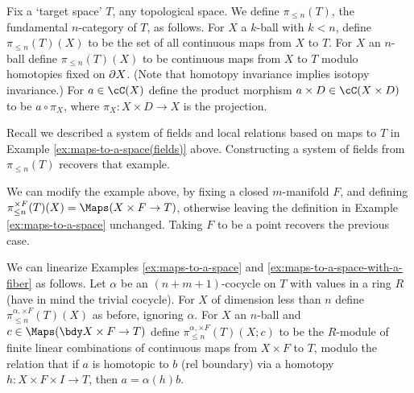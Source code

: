 \begin{example}
\rm
\label{ex:maps-to-a-space}%
Fix a `target space' $T$, any topological space.
We define $\pi_{\leq n}(T)$, the fundamental $n$-category of $T$, as follows.
For $X$ a $k$-ball with $k < n$, define $\pi_{\leq n}(T)(X)$ to be the set of 
all continuous maps from $X$ to $T$.
For $X$ an $n$-ball define $\pi_{\leq n}(T)(X)$ to be continuous maps from $X$ to $T$ modulo
homotopies fixed on $\partial X$.
(Note that homotopy invariance implies isotopy invariance.)
For $a\in \cC(X)$ define the product morphism $a\times D \in \cC(X\times D)$ to
be $a\circ\pi_X$, where $\pi_X : X\times D \to X$ is the projection.

Recall we described a system of fields and local relations based on maps to $T$ in Example \ref{ex:maps-to-a-space(fields)} above.
Constructing a system of fields from $\pi_{\leq n}(T)$ recovers that example.
\end{example}

\begin{example}
\rm
\label{ex:maps-to-a-space-with-a-fiber}%
We can modify the example above, by fixing a
closed $m$-manifold $F$, and defining $\pi^{\times F}_{\leq n}(T)(X) = \Maps(X \times F \to T)$, 
otherwise leaving the definition in Example \ref{ex:maps-to-a-space} unchanged.
Taking $F$ to be a point recovers the previous case.
\end{example}

\begin{example}
\rm
\label{ex:linearized-maps-to-a-space}%
We can linearize Examples \ref{ex:maps-to-a-space} and \ref{ex:maps-to-a-space-with-a-fiber} as follows.
Let $\alpha$ be an $(n{+}m{+}1)$-cocycle on $T$ with values in a ring $R$
(have in mind the trivial cocycle).
For $X$ of dimension less than $n$ define $\pi^{\alpha, \times F}_{\leq n}(T)(X)$ as before, ignoring $\alpha$.
For $X$ an $n$-ball and $c\in \Maps(\bdy X \times F \to T)$ define $\pi^{\alpha, \times F}_{\leq n}(T)(X; c)$ to be
the $R$-module of finite linear combinations of continuous maps from $X\times F$ to $T$,
modulo the relation that if $a$ is homotopic to $b$ (rel boundary) via a homotopy
$h: X\times F\times I \to T$, then $a = \alpha(h)b$.
\end{example}


